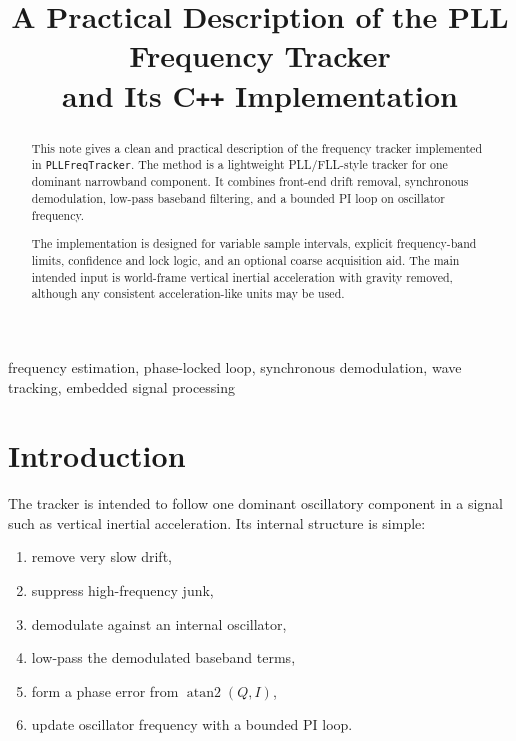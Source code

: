 \documentclass[conference]{IEEEtran}
\title{A Practical Description of the PLL Frequency Tracker\\
and Its C\texttt{++} Implementation}
\author{%
    \IEEEauthorblockN{Mikhail S.\ Grushinskiy}
    \IEEEauthorblockA{Independent Researcher\\
    Bareboat Necessities Project\\
    \texttt{mgrouch@users.github.com}}
}
\begin{document}
    \maketitle

    \begin{abstract}
        This note gives a clean and practical description of the frequency tracker
        implemented in \texttt{PLLFreqTracker}. The method is a lightweight
        PLL/FLL-style tracker for one dominant narrowband component. It combines
        front-end drift removal, synchronous demodulation, low-pass baseband
        filtering, and a bounded PI loop on oscillator frequency.

        The implementation is designed for variable sample intervals, explicit
        frequency-band limits, confidence and lock logic, and an optional coarse
        acquisition aid. The main intended input is world-frame vertical inertial
        acceleration with gravity removed, although any consistent
        acceleration-like units may be used.
    \end{abstract}

    \begin{IEEEkeywords}
        frequency estimation, phase-locked loop, synchronous demodulation, wave
        tracking, embedded signal processing
    \end{IEEEkeywords}

    \section{Introduction}

    The tracker is intended to follow one dominant oscillatory component in a
    signal such as vertical inertial acceleration. Its internal structure is
    simple:

    \begin{enumerate}[leftmargin=1.5em]
        \item remove very slow drift,
        \item suppress high-frequency junk,
        \item demodulate against an internal oscillator,
        \item low-pass the demodulated baseband terms,
        \item form a phase error from \(\operatorname{atan2}(Q,I)\),
        \item update oscillator frequency with a bounded PI loop.
    \end{enumerate}
\end{document}
